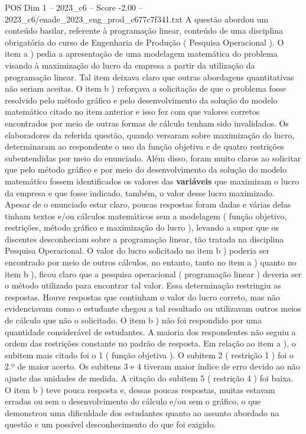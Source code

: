 \begin{textsample}{POS Dim 1 – 2023\_c6 – Score -2.00 – 2023\_c6/enade\_2023\_eng\_prod\_c677c7f341.txt}
A questão abordou um conteúdo basilar, referente à programação linear, conteúdo de uma disciplina obrigatória do curso de Engenharia de Produção ( Pesquisa Operacional ).
O item a ) pedia a apresentação de uma modelagem matemática do problema visando à maximização do lucro da empresa a partir da utilização da programação linear.
Tal item deixava claro que outras abordagens quantitativas não seriam aceitas.
O item b ) reforçava a solicitação de que o problema fosse resolvido pelo método gráfico e pelo desenvolvimento da solução do modelo matemático citado no item anterior e isso fez com que valores corretos encontrados por meio de outras formas de cálculo tenham sido invalidados.
Os elaboradores da referida questão, quando versaram sobre maximização do lucro, determinaram ao respondente o uso da função objetiva e de quatro restrições subentendidas por meio do enunciado.
Além disso, foram muito claros ao solicitar que pelo método gráfico e por meio do desenvolvimento da solução do modelo matemático fossem identificados os valores das \textbf{variáveis} que maximizam o lucro da empresa e que fosse indicado, também, o valor desse lucro maximizado.
Apesar de o enunciado estar claro, poucas respostas foram dadas e várias delas tinham textos e/ou cálculos matemáticos sem a modelagem ( função objetivo, restrições, método gráfico e maximização do lucro ), levando a supor que os discentes desconheciam sobre a programação linear, tão tratada na disciplina Pesquisa Operacional.
O valor do lucro solicitado no item b ) poderia ser encontrado por meio de outros cálculos, no entanto, tanto no item a ) quanto no item b ), ficou claro que a pesquisa operacional ( programação linear ) deveria ser o método utilizado para encontrar tal valor.
Essa determinação restringiu as respostas.
Houve respostas que continham o valor do lucro correto, mas não evidenciavam como o estudante chegou a tal resultado ou utilizavam outros meios de cálculo que não o solicitado.
O item b ) não foi respondido por uma quantidade considerável de estudantes.
A maioria dos respondentes não seguiu a ordem das restrições constante no padrão de resposta.
Em relação ao item a ), o subitem mais citado foi o 1 ( função objetiva ).
O subitem 2 ( restrição 1 ) foi o 2.º de maior acerto.
Os subitens 3 e 4 tiveram maior índice de erro devido ao não ajuste das unidades de medida.
A citação do subitem 5 ( restrição 4 ) foi baixa.
O item b ) teve pouca resposta e, dessas poucas respostas, muitas estavam erradas ou sem o desenvolvimento do cálculo e/ou sem o gráfico, o que demonstrou uma dificuldade dos estudantes quanto ao assunto abordado na questão e um possível desconhecimento do que foi exigido.

\end{textsample}
